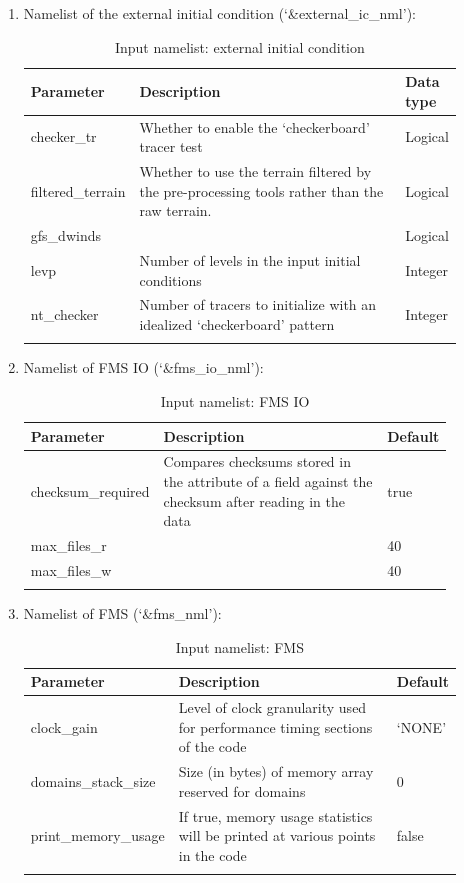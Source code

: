 \documentclass[11pt,fleqn]{report}              %
\begin{document}
\begin{enumerate}
\item Namelist of the external initial condition (`\&external\_ic\_nml'):
{
\scriptsize
\begin{longtable}{p{0.12\linewidth} | p{0.7\linewidth} | p{0.08\linewidth} }
\hline
\hline
Parameter & Description & Data type \\
\hline
checker\_tr & Whether to enable the `checkerboard' tracer test & Logical \\
filtered\_terrain & Whether to use the terrain filtered by the pre-processing tools rather than the raw terrain. & Logical \\
gfs\_dwinds & & Logical \\
levp & Number of levels in the input initial conditions & Integer \\
nt\_checker & Number of tracers to initialize with an idealized `checkerboard' pattern & Integer \\
\hline
\caption{Input namelist: external initial condition}
\label{table:fv3_input_nml_external_ic}
\end{longtable}
}

\item Namelist of FMS IO (`\&fms\_io\_nml'):
{
\scriptsize
\begin{longtable}{p{0.16\linewidth} | p{0.64\linewidth} | p{0.08\linewidth} }
\hline
\hline
Parameter & Description & Default \\
\hline
checksum\_required & Compares checksums stored in the attribute of a field against the checksum after reading in the data & true \\
max\_files\_r & & 40 \\
max\_files\_w & & 40 \\
\hline
\caption{Input namelist: FMS IO}
\label{table:fv3_input_nml_fms_io}
\end{longtable}
}

\item Namelist of FMS (`\&fms\_nml'):
{
\scriptsize
\begin{longtable}{p{0.17\linewidth} | p{0.65\linewidth} | p{0.08\linewidth} }
\hline
\hline
Parameter & Description & Default \\
\hline
clock\_gain & Level of clock granularity used for performance timing sections of the code  & `NONE' \\
domains\_stack\_size & Size (in bytes) of memory array reserved for domains & 0 \\
print\_memory\_usage & If true, memory usage statistics will be printed at various points in the code & false \\
\hline
\caption{Input namelist: FMS}
\label{table:fv3_input_nml_fms}
\end{longtable}
}


\end{enumerate}
\end{document}
